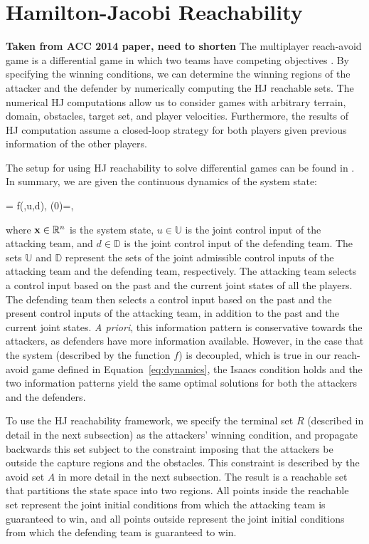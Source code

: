 \section{Hamilton-Jacobi Reachability} \label{subsec:hj_background}
\textbf{Taken from ACC 2014 paper, need to shorten}
The multiplayer reach-avoid game is a differential game in which two teams have competing objectives \cite{b:basar-olsder-1999}. By specifying the winning conditions, we can determine the winning regions of the attacker and the defender by numerically computing the HJ reachable sets. The numerical HJ computations allow us to consider games with arbitrary terrain, domain, obstacles, target set, and player velocities. Furthermore, the results of HJ computation assume a closed-loop strategy for both players given previous information of the other players.

The setup for using HJ reachability to solve differential games can be found in \cite{j:mitchell-TAC-2005, LSToolbox, Huang2011}. In summary, we are given the continuous dynamics of the system state:

\bq
\dxj = f(\xj,u,d), \xj(0)=\xjn,
\eq

\noindent where $\mathbf{x}\in\mathbb{R}^n$ is the system state, $u\in\mathbb{U}$ is the joint control input of the attacking team, and $d\in\mathbb{D}$ is the joint control input of the defending team. The sets $\mathbb{U}$ and $\mathbb{D}$ represent the sets of the joint admissible control inputs of the attacking team and the defending team, respectively. The attacking team selects a control input based on the past and the current joint states of all the players. The defending team then selects a control input based on the past and the present control inputs of the attacking team, in addition to
the past and the current joint states. \textit{A priori}, this information pattern is conservative towards the attackers, as defenders have more information available. However, in the case that the system (described by the function $f$) is decoupled, which is
true in our reach-avoid game defined in Equation~\eqref{eq:dynamics}, the Isaacs condition \cite{b:isaacs-1967} holds and the two information patterns yield the same optimal solutions for both the attackers and the defenders.

To use the HJ reachability framework, we specify the terminal set $R$ (described in detail in the next subsection) as the attackers' winning condition, and propagate backwards this set subject to the constraint imposing that the attackers be outside the capture regions and the obstacles. This constraint is described by the avoid set $A$ in more detail in the next subsection. The result is a reachable set that partitions the state space into two regions. All points inside the reachable set represent the joint initial conditions from which the attacking team is guaranteed to win, and all points outside represent the joint initial conditions from which the defending team is guaranteed to win.


